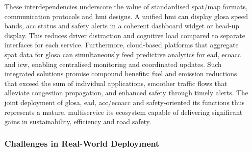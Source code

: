 \mynewline
These interdependencies underscore the value of standardised \ac{spat}/\ac{map} formats, communication protocols and \ac{hmi} designs. A unified \ac{hmi} can display \ac{glosa} speed bands, \ac{acc} status and safety alerts in a coherent dashboard widget or head-up display. This reduces driver distraction and cognitive load compared to separate interfaces for each service. Furthermore, cloud-based platforms that aggregate \ac{spat} data for \ac{glosa} can simultaneously feed predictive analytics for \ac{ead}, \ac{ecoacc} and \ac{icw}, enabling centralised monitoring and coordinated updates. Such integrated solutions promise compound benefits: fuel and emission reductions that exceed the sum of individual applications, smoother traffic flows that alleviate congestion propagation, and enhanced safety through timely alerts. The joint deployment of \ac{glosa}, \ac{ead}, \ac{acc}/\ac{ecoacc} and safety-oriented \ac{its} functions thus represents a mature, multiservice \ac{its} ecosystem capable of delivering significant gains in sustainability, efficiency and road safety.


\subsubsection{Challenges in Real-World Deployment}
\label{subsubsec:deployment_challenges}


